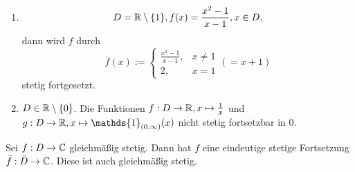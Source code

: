 \documentclass[../ana1.tex]{subfiles}
\begin{document}
\begin{bspe}\leavevmode
    \begin{enumerate}
        \item \[ D = \mathbb{R} \setminus \{1\}, 
        f(x) = \frac{x^2 - 1}{x - 1}, x\in D, \]
        dann wird \(f\) durch
        \[ \bar{f}(x) := 
        \begin{cases}
            \frac{x^2 - 1}{x - 1}, &x\neq 1\\
            2, &x = 1
        \end{cases} (=x+1) \]
        stetig fortgesetzt.
        \item \( D \in\mathbb{R}\setminus \{0\} \). Die 
        Funktionen \( f: D \rightarrow \mathbb{R}, 
        x\mapsto \frac{1}{x} \) und \( g: D 
        \rightarrow \R, x \mapsto 
        \mathds{1}_{(0,\infty)}(x) \) nicht stetig 
        fortsetzbar in \(0\).
    \end{enumerate}
\end{bspe}
\begin{satz}
    Sei \( f: D\rightarrow \mathbb{C} \) gleichmäßig stetig. 
    Dann hat \(f\) eine eindeutige stetige Fortsetzung 
    \( \bar{f} : \bar{D} \rightarrow \mathbb{C} \). Diese ist 
    auch gleichmäßig stetig.
\end{satz}
\end{document}
